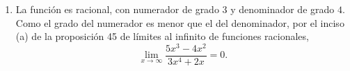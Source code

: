 \documentclass[12pt,a4paper]{article}
\begin{document}
\begin{solucion}
\begin{enumerate}
            \begin{equation*}
                \lim_{x\to\infty}\left(\frac{1}{x}+\arctan(x)\right)=\lim_{x\to\infty}\frac{1}{x}+\lim_{x\to\infty}\arctan(x)=0+\frac{\pi}{2}=\frac{\pi}{2}.
            \end{equation*}
            \item[(f)] La función es racional, con numerador de grado $3$ y denominador de grado $4$. Como el grado del numerador es menor que el del denominador, por el inciso (a) de la proposición 45 de límites al infinito de funciones racionales,
            \begin{equation*}
                \lim_{x\to\infty}\frac{5x^{3}-4x^{2}}{3x^{4}+2x}=0.
            \end{equation*}
        \end{enumerate}
    \end{solucion}
\end{document}
